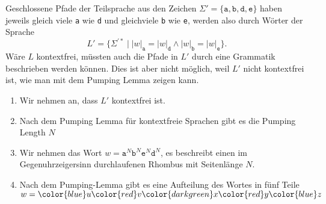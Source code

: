 \begin{loesung}
Geschlossene Pfade der Teilsprache aus den Zeichen
$\Sigma'=\{ \texttt{a}, \texttt{b}, \texttt{d}, \texttt{e} \}$
haben jeweils gleich viele \texttt{a} wie \texttt{d} 
und gleichviele \texttt{b} wie \texttt{e}, werden also durch
Wörter der Sprache
\begin{equation}
L'
=
\{
\Sigma^{\prime *}
\mid
|w|_{\texttt{a}}
=
|w|_{\texttt{d}}
\wedge
|w|_{\texttt{b}}
=
|w|_{\texttt{e}}
\}.
\end{equation}
Wäre $L$ kontextfrei, müssten auch die Pfade in $L'$ durch eine Grammatik
beschrieben werden können.
Dies ist aber nicht möglich, weil $L'$ nicht kontextfrei ist, wie man
mit dem Pumping Lemma zeigen kann.
\begin{enumerate}
\item
Wir nehmen an, dass $L'$ kontextfrei ist.
\item
Nach dem Pumping Lemma für kontextfreie Sprachen gibt es die
Pumping Length $N$
\item
Wir nehmen das Wort
$w= \texttt{a}^N \texttt{b}^N \texttt{e}^N \texttt{d}^N $,
es beschreibt einen im Gegenuhrzeigersinn durchlaufenen Rhombus
mit Seitenlänge $N$.
\item
Nach dem Pumping-Lemma gibt es eine Aufteilung des Wortes in
fünf Teile
$w=
{\color{blue}u}
{\color{red}v}
{\color{darkgreen}x}
{\color{red}y}
{\color{blue}z}$
\begin{center}
\end{center}
\end{enumerate}
\end{loesung}
